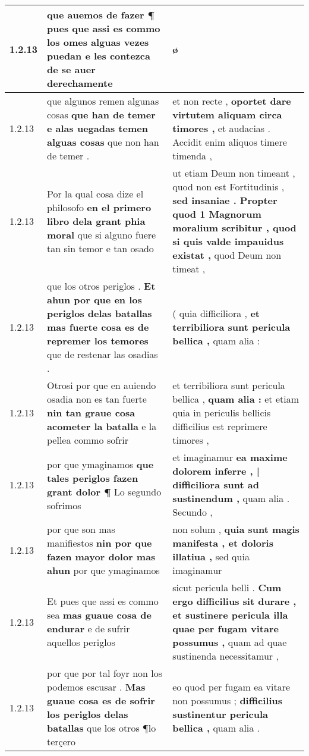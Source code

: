 \begin{tabular}{|p{1cm}|p{6.5cm}|p{6.5cm}|}
1.2.13 & que auemos de fazer ¶ \textbf{ pues que assi es commo los omes alguas vezes puedan } e les contezca de se auer derechamente & ø \\\hline
1.2.13 & que algunos remen algunas cosas \textbf{ que han de temer e alas uegadas temen alguas cosas } que non han de temer . & et non recte , \textbf{ oportet dare virtutem aliquam circa timores , } et audacias . Accidit enim aliquos timere timenda , \\\hline
1.2.13 & Por la qual cosa dize el philosofo \textbf{ en el primero libro dela grant phia moral } que si alguno fuere tan sin temor e tan osado & ut etiam Deum non timeant , quod non est Fortitudinis , \textbf{ sed insaniae . Propter quod 1 Magnorum moralium scribitur , quod si quis valde impauidus existat , } quod Deum non timeat , \\\hline
1.2.13 & que los otros periglos . \textbf{ Et ahun por que en los periglos delas batallas mas fuerte cosa es de repremer los temores } que de restenar las osadias . & ( quia difficiliora , \textbf{ et terribiliora sunt pericula bellica , } quam alia : \\\hline
1.2.13 & Otrosi por que en auiendo osadia non es tan fuerte \textbf{ nin tan graue cosa acometer la batalla } e la pellea commo sofrir & et terribiliora sunt pericula bellica , \textbf{ quam alia : } et etiam quia in periculis bellicis difficilius est reprimere timores , \\\hline
1.2.13 & por que ymaginamos \textbf{ que tales periglos fazen grant dolor ¶ } Lo segundo sofrimos & et imaginamur \textbf{ ea maxime dolorem inferre , | difficiliora sunt ad sustinendum , } quam alia . Secundo , \\\hline
1.2.13 & por que son mas manifiestos \textbf{ nin por que fazen mayor dolor mas ahun } por que ymaginamos & non solum , \textbf{ quia sunt magis manifesta , et doloris illatiua , } sed quia imaginamur \\\hline
1.2.13 & Et pues que assi es commo sea \textbf{ mas guaue cosa de endurar } e de sufrir aquellos periglos & sicut pericula belli . \textbf{ Cum ergo difficilius sit durare , et sustinere pericula illa quae per fugam vitare possumus , } quam ad quae sustinenda necessitamur , \\\hline
1.2.13 & por que por tal foyr non los podemos escusar . \textbf{ Mas guaue cosa es de sofrir los periglos delas batallas } que los otros ¶lo terçero & eo quod per fugam ea vitare non possumus ; \textbf{ difficilius sustinentur pericula bellica , } quam alia . \\\hline

\end{tabular}
